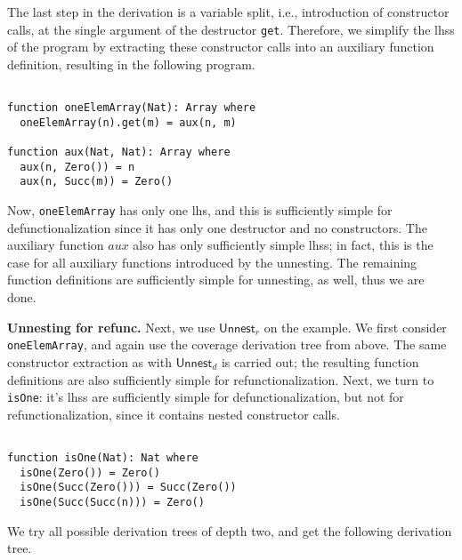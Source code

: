 \begin{prooftree}
\end{prooftree}

The last step in the derivation is a variable split, i.e., introduction of constructor calls, at the single argument of the destructor \texttt{get}. Therefore, we simplify the lhss of the program by extracting these constructor calls into an auxiliary function definition, resulting in the following program.

\begin{lstlisting}

function oneElemArray(Nat): Array where
  oneElemArray(n).get(m) = aux(n, m)

function aux(Nat, Nat): Array where
  aux(n, Zero()) = n
  aux(n, Succ(m)) = Zero()

\end{lstlisting}

Now, \texttt{oneElemArray} has only one lhs, and this is sufficiently simple for defunctionalization since it has only one destructor and no constructors. The auxiliary function $aux$ also has only sufficiently simple lhss; in fact, this is the case for all auxiliary functions introduced by the unnesting. The remaining function definitions are sufficiently simple for unnesting, as well, thus we are done.

\textbf{Unnesting for refunc.} Next, we use $\textsf{Unnest}_r$ on the example. We first consider \texttt{oneElemArray}, and again use the coverage derivation tree from above. The same constructor extraction as with $\textsf{Unnest}_d$ is carried out; the resulting function definitions are also sufficiently simple for refunctionalization. Next, we turn to \texttt{isOne}: it's lhss are sufficiently simple for defunctionalization, but not for refunctionalization, since it contains nested constructor calls.

\begin{lstlisting}

function isOne(Nat): Nat where
  isOne(Zero()) = Zero()
  isOne(Succ(Zero())) = Succ(Zero())
  isOne(Succ(Succ(n))) = Zero()

\end{lstlisting}

We try all possible derivation trees of depth two, and get the following derivation tree.

